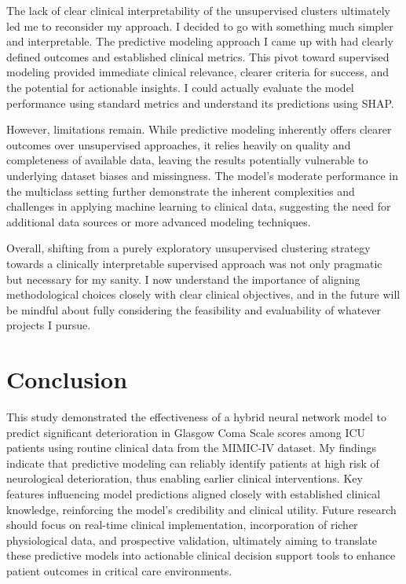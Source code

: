 \documentclass[conference]{IEEEtran}
\begin{document}
The lack of clear clinical interpretability of the unsupervised clusters ultimately led me to reconsider my approach. I decided to go with something much simpler and interpretable. The predictive modeling approach I came up with had clearly defined outcomes and established clinical metrics. This pivot toward supervised modeling provided immediate clinical relevance, clearer criteria for success, and the potential for actionable insights. I could actually evaluate the model performance using standard metrics and understand its predictions using SHAP.

However, limitations remain. While predictive modeling inherently offers clearer outcomes over unsupervised approaches, it relies heavily on quality and completeness of available data, leaving the results potentially vulnerable to underlying dataset biases and missingness. The model's moderate performance in the multiclass setting further demonstrate the inherent complexities and challenges in applying machine learning to clinical data, suggesting the need for additional data sources or more advanced modeling techniques.

Overall, shifting from a purely exploratory unsupervised clustering strategy towards a clinically interpretable supervised approach was not only pragmatic but necessary for my sanity. I now understand the importance of aligning methodological choices closely with clear clinical objectives, and in the future will be mindful about fully considering the feasibility and evaluability of whatever projects I pursue.

\section{Conclusion}

This study demonstrated the effectiveness of a hybrid neural network model to predict significant deterioration in Glasgow Coma Scale scores among ICU patients using routine clinical data from the MIMIC-IV dataset. My findings indicate that predictive modeling can reliably identify patients at high risk of neurological deterioration, thus enabling earlier clinical interventions. Key features influencing model predictions aligned closely with established clinical knowledge, reinforcing the model's credibility and clinical utility. Future research should focus on real-time clinical implementation, incorporation of richer physiological data, and prospective validation, ultimately aiming to translate these predictive models into actionable clinical decision support tools to enhance patient outcomes in critical care environments.
\end{document}
